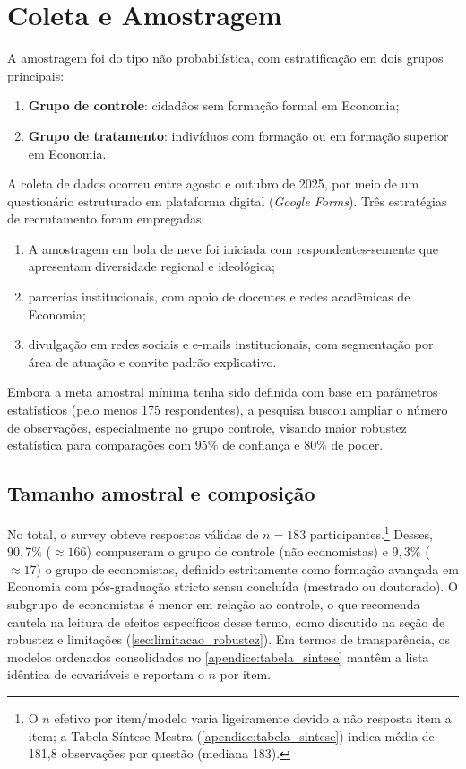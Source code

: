 \section{Coleta e Amostragem}\label{sec:coleta-amostragem}

A amostragem foi do tipo não probabilística, com estratificação em dois grupos principais:
\begin{enumerate}[label=\alph*)]
    \item \textbf{Grupo de controle}: cidadãos sem formação formal em Economia;
    \item \textbf{Grupo de tratamento}: indivíduos com formação ou em formação superior em Economia.
\end{enumerate}

A coleta de dados ocorreu entre agosto e outubro de 2025, por meio de um questionário estruturado em plataforma digital (\textit{Google Forms}). Três estratégias de recrutamento foram empregadas:
\begin{enumerate}[label=\alph*)]
    \item A amostragem em bola de neve foi iniciada com respondentes-semente que apresentam diversidade regional e ideológica;
    \item parcerias institucionais, com apoio de docentes e redes acadêmicas de Economia;
    \item divulgação em redes sociais e e-mails institucionais, com segmentação por área de atuação e convite padrão explicativo.
\end{enumerate}

Embora a meta amostral mínima tenha sido definida com base em parâmetros estatísticos (pelo menos 175 respondentes), a pesquisa buscou ampliar o número de observações, especialmente no grupo controle, visando maior robustez estatística para comparações com 95\% de confiança e 80\% de poder.

\subsection{Tamanho amostral e composição}
\label{sec:tamanho_amostral}
No total, o survey obteve respostas válidas de \(n = 183\) participantes.\footnote{O \(n\) efetivo por item/modelo varia ligeiramente devido a não resposta item a item; a Tabela-Síntese Mestra (\autoref{apendice:tabela_sintese}) indica média de 181{,}8 observações por questão (mediana 183).}
Desses, \(90{,}7\%\) (\(\approx 166\)) compuseram o grupo de controle (não economistas) e \(9{,}3\%\) (\(\approx 17\)) o grupo de economistas, definido estritamente como formação avançada em Economia com pós-graduação stricto sensu concluída (mestrado ou doutorado).
O subgrupo de economistas é menor em relação ao controle, o que recomenda cautela na leitura de efeitos específicos desse termo, como discutido na seção de robustez e limitações (\autoref{sec:limitacao_robustez}). Em termos de transparência, os modelos ordenados consolidados no \autoref{apendice:tabela_sintese} mantêm a lista idêntica de covariáveis e reportam o \(n\) por item.

